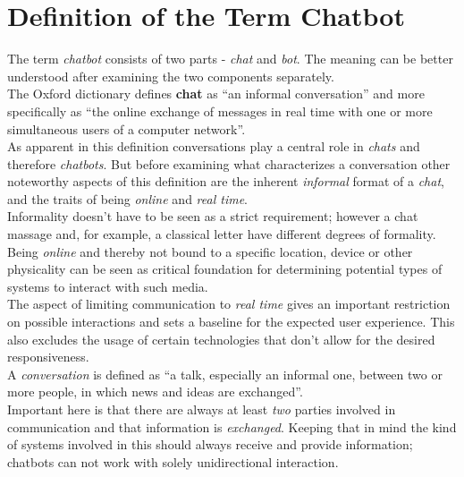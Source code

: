\section{Definition of the Term Chatbot}
\label{defchatbot}


The term \emph{chatbot} consists of two parts - \emph{chat} and \emph{bot}. The meaning can be better understood after examining the two components separately.
\\

The Oxford dictionary defines \textbf{chat} as ``an informal conversation'' and more specifically as ``the online exchange of messages in real time with one or more simultaneous users of a computer network''\cite{oxfordchat}.
\\
As apparent in this definition conversations play a central role in \emph{chats} and therefore \emph{chatbots}. But before examining what characterizes a conversation other noteworthy aspects of this definition are the inherent \emph{informal} format of a \emph{chat}, and the traits of being \emph{online} and \emph{real time}.
\\
Informality doesn't have to be seen as a strict requirement; however a chat massage and, for example, a classical letter have different degrees of formality.
\\
Being \emph{online} and thereby not bound to a specific location, device or other physicality can be seen as critical foundation for determining potential types of systems to interact with such media.
\\
The aspect of limiting communication to \emph{real time} gives an important restriction on possible interactions and sets a baseline for the expected user experience. This also excludes the usage of certain technologies that don't allow for the desired responsiveness.
\\
A \emph{conversation} is defined as ``a talk, especially an informal one, between two or more people, in which news and ideas are exchanged''\cite{oxfordconversation}.
\\
Important here is that there are always at least \emph{two} parties involved in communication and that information is \emph{exchanged}. Keeping that in mind the kind of systems involved in this should always receive and provide information; chatbots can not work with solely unidirectional interaction.
\\

